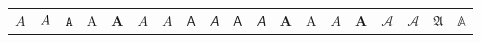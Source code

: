 \documentclass[varwidth]{standalone}
\begin{document}
\begin{tabular}{lll llll llll llll llll}
	$A$
	& $\mathnormal{A}$
	& $\mathtt{A}$
	& $\mathrm{A}$
	& $\mathbf{A}$
	& $\mathit{A}$
	& $\bm{\mathit{A}}$
	& $\mathsf{A}$
	& $\mathsfit{A}$
	& $\bm{\mathsf{A}}$
	& $\bm{\mathsfit{A}}$
	& $\bm{A}$
	& $\bm{\mathrm{A}}$
	& $\bm{\mathit{A}}$
	& $\bm{\mathbf{A}}$
	& $\mathcal{A}$
	& $\mathscr{A}$
	& $\mathfrak{A}$
	& $\mathbb{A}$
\end{tabular}
\end{document}
